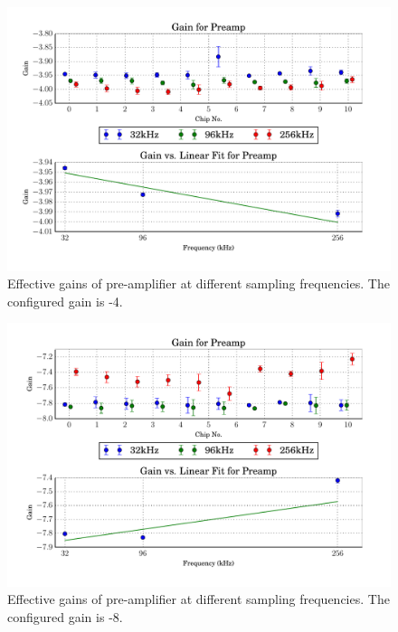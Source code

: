 \begin{figure}
    \centering
    \includegraphics[width=0.95\linewidth]{images/plots/dc_slope_preamp_gain-4.pdf}
    \caption{Effective gains of pre-amplifier at different sampling frequencies. The configured gain is -4.}
    \label{fig:preamp_slope-4}
\end{figure}
\begin{figure}
    \centering
    \includegraphics[width=0.95\linewidth]{images/plots/dc_slope_preamp_gain-8.pdf}
    \caption{Effective gains of pre-amplifier at different sampling frequencies. The configured gain is -8.}
    \label{fig:preamp_slope-8}
\end{figure}
